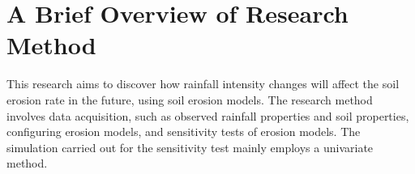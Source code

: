 %
%
%
%
%

\section{A Brief Overview of Research Method}
\label{sec:OverviewOfResearchMethods}

This research aims to discover how rainfall intensity changes will affect the
soil erosion rate in the future, using soil erosion models. The research method
involves data acquisition, such as observed rainfall properties and soil
properties, configuring erosion models, and sensitivity tests of erosion models.
The simulation carried out for the sensitivity test mainly employs a univariate
method.


